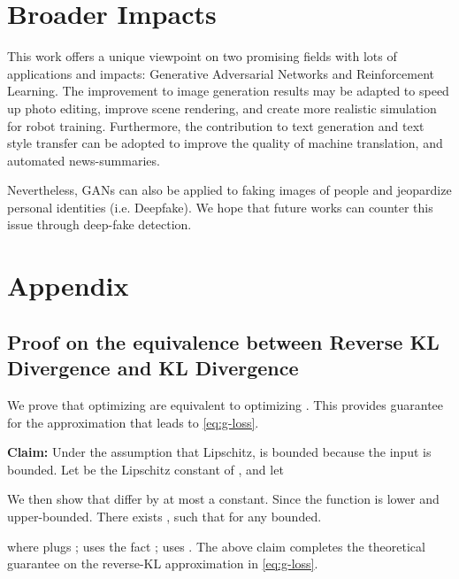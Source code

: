 \documentclass{article}
\newcommand{\0}{\bm{0}}
\begin{document}
\section*{Broader Impacts}
This work offers a unique viewpoint on two promising fields with lots of applications and impacts: Generative Adversarial Networks and Reinforcement Learning. The improvement to image generation results may be adapted to speed up photo editing, improve scene rendering, and create more realistic simulation for robot training. Furthermore, the contribution to text generation and text style transfer can be adopted to improve the quality of machine translation, and automated news-summaries.

Nevertheless, GANs can also be applied to faking images of people and jeopardize personal identities (i.e. Deepfake). We hope that future works can counter this issue through deep-fake detection.














\newpage



\section{Appendix}

\subsection{Proof on the equivalence between Reverse KL Divergence and KL Divergence} \label{pf_kl}
We prove that optimizing  are equivalent to optimizing .
This provides guarantee for the approximation that leads to \eqref{eq:g-loss}. 

\textbf{Claim:} Under the assumption that  Lipschitz,  is bounded because the input  is bounded. Let  be the Lipschitz constant of , and let 

We then show that  differ  by at most a constant. Since the function  is lower and upper-bounded. There exists , such that  for any  bounded.

where  plugs ;  uses the fact ;  uses .
The above claim completes the theoretical guarantee on the reverse-KL approximation in \eqref{eq:g-loss}.
\end{document}
